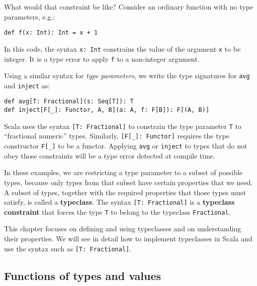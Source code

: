 What would that constraint be like? Consider an ordinary function
with no type parameters, e.g.:
\begin{lstlisting}
def f(x: Int): Int = x + 1
\end{lstlisting}
In this code, the syntax \lstinline!x: Int! constrains the value
of the argument \lstinline!x! to be integer. It is a type error to
apply \lstinline!f! to a non-integer argument. 

Using a similar syntax for \emph{type} \emph{parameters}, we write
the type signatures for \lstinline!avg! and \lstinline!inject! as:
\begin{lstlisting}
def avg[T: Fractional](s: Seq[T]): T
def inject[F[_]: Functor, A, B](a: A, f: F[B]): F[(A, B)]
\end{lstlisting}
Scala uses the syntax \lstinline![T: Fractional]! to constrain the
type parameter \lstinline!T! to \textsf{``}fractional numeric\textsf{''} types. Similarly,
\lstinline![F[_]: Functor]! requires the type constructor \lstinline!F[_]!
to be a functor. Applying \lstinline!avg! or \lstinline!inject!
to types that do not obey those constraints will be a type error detected
at compile time.

In these examples, we are restricting a type parameter to a subset
of possible types, because only types from that subset have certain
properties that we need. A subset of types, together with the required
properties that those types must satisfy, is called a \textbf{typeclass}.
The syntax \lstinline![T: Fractional]! is a \textbf{typeclass constraint}
that forces the type \lstinline!T! to belong to the typeclass \lstinline!Fractional!. 

This chapter focuses on defining and using typeclasses and on understanding
their properties. We will see in detail how to implement typeclasses
in Scala and use the syntax such as \lstinline![T: Fractional]!.

\subsection{Functions of types and values}

